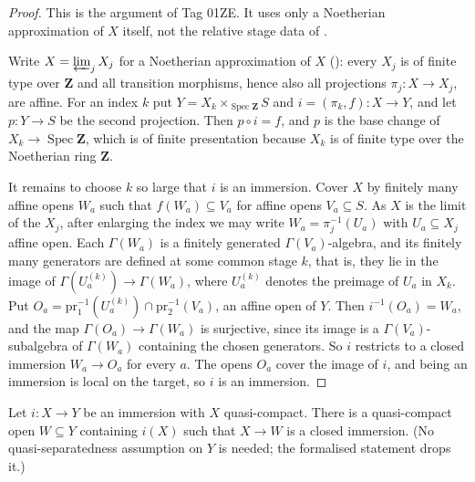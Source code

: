 \begin{proof}
  \leanok
  This is the argument of Tag 01ZE.  It uses only a Noetherian approximation of
  $X$ itself, not the relative stage data of
  .

  Write $X=\varprojlim_j X_j$ for a Noetherian approximation of $X$
  (): every $X_j$ is of finite type
  over $\mathbf Z$ and all transition morphisms, hence also all projections
  $\pi_j\colon X\to X_j$, are affine.  For an index $k$ put
  $Y=X_k\times_{\operatorname{Spec}\mathbf Z}S$ and
  $i=(\pi_k,f)\colon X\to Y$, and let $p\colon Y\to S$ be the second
  projection.  Then $p\circ i=f$, and $p$ is the base change of
  $X_k\to\operatorname{Spec}\mathbf Z$, which is of finite presentation because
  $X_k$ is of finite type over the Noetherian ring $\mathbf Z$.

  It remains to choose $k$ so large that $i$ is an immersion.  Cover $X$ by
  finitely many affine opens $W_a$ such that $f(W_a)\subseteq V_a$ for affine
  opens $V_a\subseteq S$.  As $X$ is the limit of the $X_j$, after enlarging the
  index we may write $W_a=\pi_j^{-1}(U_a)$ with $U_a\subseteq X_j$ affine open.
  Each $\Gamma(W_a)$ is a finitely generated $\Gamma(V_a)$-algebra, and its
  finitely many generators are defined at some common stage $k$, that is, they
  lie in the image of $\Gamma(U_a^{(k)})\to\Gamma(W_a)$, where $U_a^{(k)}$
  denotes the preimage of $U_a$ in $X_k$.  Put
  $O_a=\mathrm{pr}_1^{-1}(U_a^{(k)})\cap\mathrm{pr}_2^{-1}(V_a)$, an affine open
  of $Y$.  Then $i^{-1}(O_a)=W_a$, and the map $\Gamma(O_a)\to\Gamma(W_a)$ is
  surjective, since its image is a $\Gamma(V_a)$-subalgebra of $\Gamma(W_a)$
  containing the chosen generators.  So $i$ restricts to a closed immersion
  $W_a\to O_a$ for every $a$.  The opens $O_a$ cover the image of $i$, and being
  an immersion is local on the target, so $i$ is an immersion.
\end{proof}

\begin{lemma}
  \label{lemma:nagata-immersion-shrink-to-closed-exists}
  \leanok

  Let $i\colon X\to Y$ be an immersion with $X$ quasi-compact.  There is a
  quasi-compact open $W\subseteq Y$ containing $i(X)$ such that $X\to W$ is a
  closed immersion.  (No quasi-separatedness assumption on $Y$ is needed; the
  formalised statement drops it.)
\end{lemma}

